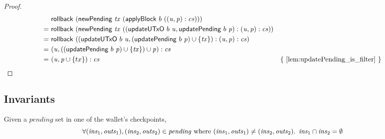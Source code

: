 \documentclass{article}
\theoremstyle{definition}{
  \newtheorem{lemma}{Lemma}[section] %
  \newtheorem{definition}[lemma]{Definition}
}
\theoremstyle{theorem}{
  \newtheorem{invariant}[lemma]{Invariant}
  \newtheorem{proofobligation}[lemma]{Proof Obligation}
}
\numberwithin{equation}{lemma}
\begin{document}
\begin{proof}
\begin{align*}
    & \mathsf{rollback} ~ (\mathsf{newPending} ~ \mathit{tx} ~ (\mathsf{applyBlock} ~ b ~ ((\mathit{u}, \mathit{p}) : \mathit{cs}))) \\
= ~ & \mathsf{rollback} ~ (\mathsf{newPending} ~ \mathit{tx} ~ (( \mathsf{updateUTxO} ~ b ~ \mathit{u}
         , \mathsf{updatePending} ~ b ~ \mathit{p}
         )
         : (\mathit{u}, \mathit{p}) : \mathit{cs}
         )) \\
= ~ & \mathsf{rollback} ~ (( \mathsf{updateUTxO} ~ b ~ \mathit{u}
         , (\mathsf{updatePending} ~ b ~ \mathit{p}) \cup \{\mathit{tx}\}
         )
         : (\mathit{u}, \mathit{p}) : \mathit{cs}
         ) \\
= ~ & (\mathit{u}, ((\mathsf{updatePending} ~ b ~ \mathit{p}) \cup \{\mathit{tx}\}) \cup \mathit{p}) : \mathit{cs} \\
= ~ & (\mathit{u}, \mathit{p} \cup \{tx\}) : \mathit{cs} & \text{\{ \cref{lem:updatePending_is_filter} \}}
\end{align*}
\end{proof}

\subsection{Invariants}

\begin{invariant}
Given a $\mathit{pending}$ set in one of the wallet's checkpoints,
\begin{equation*}
\forall (\mathit{ins}_1, \mathit{outs}_1), (\mathit{ins}_2, \mathit{outs}_2) \in \mathit{pending} \text{ where } (\mathit{ins}_1, \mathit{outs}_1) \ne (\mathit{ins}_2, \mathit{outs}_2) \ldotp ~
\mathit{ins}_1 \cap \mathit{ins}_2 = \emptyset
\end{equation*}
\end{invariant}
\end{document}
